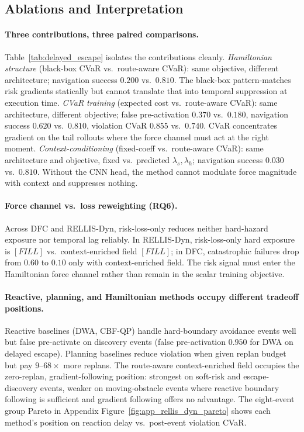 \subsection{Ablations and Interpretation}
\label{sec:exp_interpretation}

\paragraph{Three contributions, three paired comparisons.}
Table~\ref{tab:delayed_escape} isolates the contributions cleanly.
\emph{Hamiltonian structure} (black-box CVaR vs.\ route-aware CVaR):
same objective, different architecture; navigation success $0.200$
vs.\ $0.810$.
The black-box pattern-matches risk gradients statically but cannot
translate that into temporal suppression at execution time.
\emph{CVaR training} (expected cost vs.\ route-aware CVaR):
same architecture, different objective; false pre-activation $0.370$
vs.\ $0.180$, navigation success $0.620$ vs.\ $0.810$, violation
CVaR $0.855$ vs.\ $0.740$.
CVaR concentrates gradient on the tail rollouts where the force channel
must act at the right moment.
\emph{Context-conditioning} (fixed-coeff vs.\ route-aware CVaR):
same architecture and objective, fixed vs.\ predicted $\lambda_s,\lambda_h$;
navigation success $0.030$ vs.\ $0.810$.
Without the CNN head, the method cannot modulate force magnitude with
context and suppresses nothing.

\paragraph{Force channel vs.\ loss reweighting (RQ6).}
Across DFC and RELLIS-Dyn, risk-loss-only reduces neither hard-hazard
exposure nor temporal lag reliably.
In RELLIS-Dyn, risk-loss-only hard exposure is $[FILL]$ vs.\ context-enriched field
$[FILL]$; in DFC, catastrophic failures drop from $0.60$ to $0.10$
only with context-enriched field.
The risk signal must enter the Hamiltonian force channel rather than
remain in the scalar training objective.

\paragraph{Reactive, planning, and Hamiltonian methods occupy different
tradeoff positions.}
Reactive baselines (DWA, CBF-QP) handle hard-boundary avoidance events
well but false pre-activate on discovery events (false pre-activation
$0.950$ for DWA on delayed escape).
Planning baselines reduce violation when given replan budget but pay
$9$--$68\times$ more replans.
The route-aware context-enriched field occupies the zero-replan, gradient-following
position: strongest on soft-risk and escape-discovery events, weaker
on moving-obstacle events where reactive boundary following is
sufficient and gradient following offers no advantage.
The eight-event group Pareto in Appendix
Figure~\ref{fig:app_rellis_dyn_pareto} shows each method's position
on reaction delay vs.\ post-event violation CVaR.

